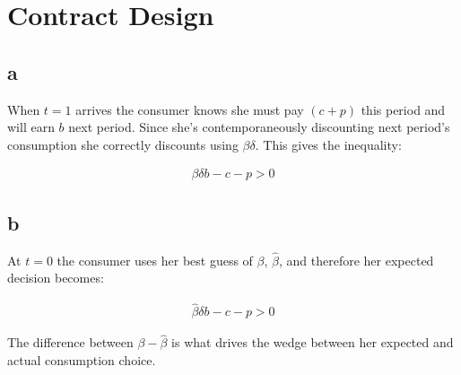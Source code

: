 \documentclass{article}
\begin{document}
   

\section{Contract Design}



\subsection*{a}


When $t=1$ arrives the consumer knows she must pay $(c+p)$ this period and will 
earn $b$ next period. Since she's contemporaneously discounting next period's 
consumption she correctly discounts using $\beta \delta$. This gives the 
inequality:

\begin{align*}
    \beta \delta b -c - p > 0
\end{align*}



\subsection*{b}
At $t=0$ the consumer uses her best guess of $\beta$, $\hat{\beta}$, and therefore
her expected decision becomes:

\begin{align*}
   \hat{\beta} \delta b - c - p > 0 
\end{align*}


The difference between $\beta -\hat{\beta}$ is what drives the wedge between her 
expected and actual consumption choice.
\end{document}
